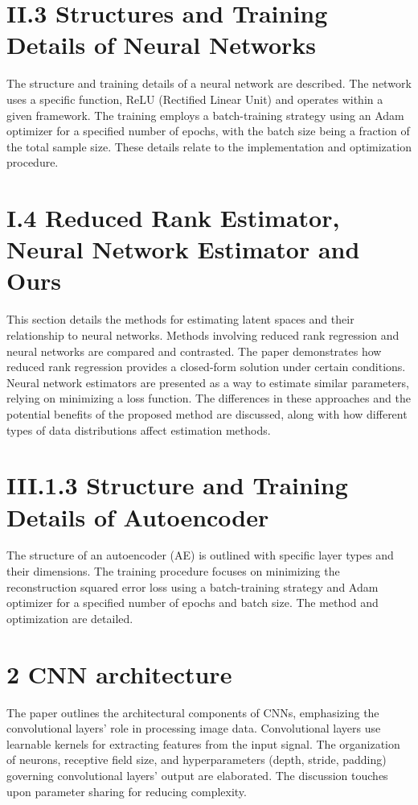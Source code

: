 \documentclass{article}
\begin{document}
\section*{II.3 Structures and Training Details of Neural Networks}

The structure and training details of a neural network are described. The network uses a specific function, ReLU (Rectified Linear Unit) and operates within a given framework. The training employs a batch-training strategy using an Adam optimizer for a specified number of epochs, with the batch size being a fraction of the total sample size.  These details relate to the implementation and optimization procedure.


\section*{I.4 Reduced Rank Estimator, Neural Network Estimator and Ours}

This section details the methods for estimating latent spaces and their relationship to neural networks. Methods involving reduced rank regression and neural networks are compared and contrasted. The paper demonstrates how reduced rank regression provides a closed-form solution under certain conditions.  Neural network estimators are presented as a way to estimate similar parameters, relying on minimizing a loss function.  The differences in these approaches and the potential benefits of the proposed method are discussed, along with how different types of data distributions affect estimation methods.


\section*{III.1.3 Structure and Training Details of Autoencoder}

The structure of an autoencoder (AE) is outlined with specific layer types and their dimensions.  The training procedure focuses on minimizing the reconstruction squared error loss using a batch-training strategy and Adam optimizer for a specified number of epochs and batch size. The method and optimization are detailed.


\section*{2 CNN architecture}

The paper outlines the architectural components of CNNs, emphasizing the convolutional layers' role in processing image data. Convolutional layers use learnable kernels for extracting features from the input signal.  The organization of neurons, receptive field size, and hyperparameters (depth, stride, padding) governing convolutional layers' output are elaborated. The discussion touches upon parameter sharing for reducing complexity.
\end{document}
